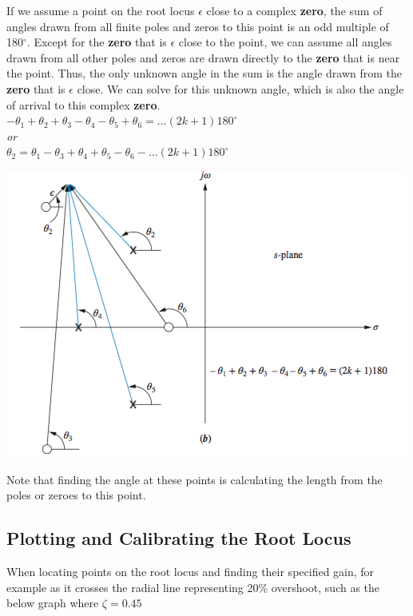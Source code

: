\documentclass[11pt]{article}
\begin{document}
    If we assume a point on the root locus $\epsilon$ close to a complex \textbf{zero}, the sum of angles drawn from all finite poles and zeros to this point is an odd multiple of 180$^\circ$. Except for the \textbf{zero} that is $\epsilon$ close to the point, we can assume all angles drawn from all other poles and zeros are drawn directly to the \textbf{zero} that is near the point. Thus, the only unknown angle in the sum is the angle drawn from the \textbf{zero} that is $\epsilon$ close. We can solve for this unknown angle, which is also the angle of arrival to this complex \textbf{zero}. \\ 

    $-\theta_1 + \theta_2 + \theta_3 - \theta_4 - \theta_5 + \theta_6 =(2k+1)180^\circ$ \\ 
    
    \textit{or} \\ 

    $\theta_2 = \theta_1 - \theta_3 + \theta_4 + \theta_5 - \theta_6 -(2k+1)180^\circ$ \\

    \begin{center}
        \includegraphics[width=300 px]{img/angles-zero} \\
    \end{center}  

    Note that finding the angle at these points is calculating the length from the poles or zeroes to this point.

    \subsection{Plotting and Calibrating the Root Locus}

    When locating points on the root locus and finding their specified gain, for example as it crosses the radial line representing 20\% overshoot, such as the below graph where $\zeta = 0.45$ \\ 
\end{document}
